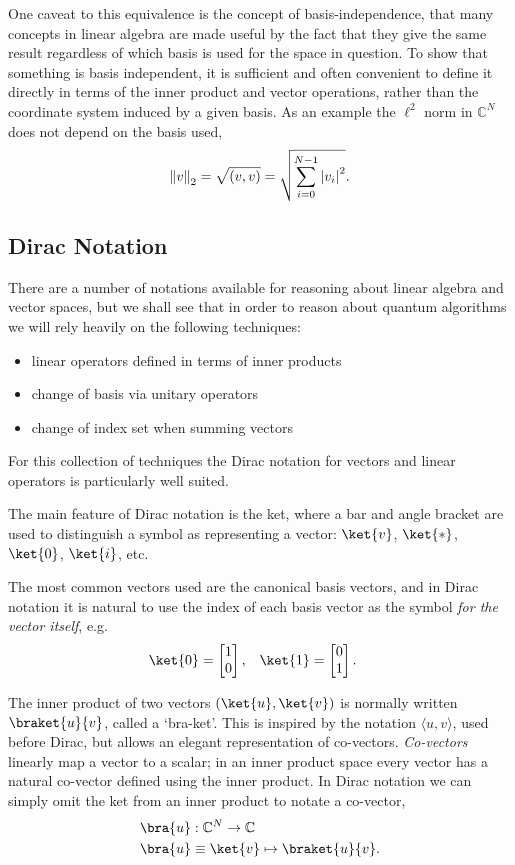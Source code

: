 One caveat to this equivalence is the concept of basis-independence, that many concepts in linear algebra are made useful by the fact that they give the same result regardless of which basis is used for the space in question. To show that something is basis independent, it is sufficient and often convenient to define it directly in terms of the inner product and vector operations, rather than the coordinate system induced by a given basis. As an example the $\ell^2$ norm in $\mathbb{C}^N$ does not depend on the basis used,
\[\left\Vert v \right\Vert_2 = \sqrt{(v, v)} = \sqrt{\sum_{i=0}^{N-1}\left| v_i \right|^2}.\]

\subsection{Dirac Notation}\label{dirac}
There are a number of notations available for reasoning about linear algebra and vector spaces, but we shall see that in order to reason about quantum algorithms we will rely heavily on the following techniques:
\begin{itemize}
	\item linear operators defined in terms of inner products
	\item change of basis via unitary operators
	\item change of index set when summing vectors
\end{itemize}
For this collection of techniques the Dirac notation for vectors and linear operators is particularly well suited.

The main feature of Dirac notation is the ket, where a bar and angle bracket are used to distinguish a symbol as representing a vector: $\ket{v}$, $\ket{*}$, $\ket{0}$, $\ket{i}$, etc.

The most common vectors used are the canonical basis vectors, and in Dirac notation it is natural to use the index of each basis vector as the symbol \textit{for the vector itself}, e.g.
\begin{align*}
	\ket{0} = \left[\begin{matrix}
		1\\
		0
	\end{matrix}\right],
	&&&
	\ket{1} = \left[\begin{matrix}
		0\\
		1
	\end{matrix}\right].
\end{align*}

The inner product of two vectors $(\ket{u}, \ket{v})$ is normally written $\braket{u}{v}$, called a `bra-ket'. This is inspired by the notation $\langle u, v\rangle$, used before Dirac, but allows an elegant representation of co-vectors. \emph{Co-vectors} linearly map a vector to a scalar; in an inner product space every vector has a natural co-vector defined using the inner product. In Dirac notation we can simply omit the ket from an inner product to notate a co-vector,
\begin{align*}
	\bra{u} &: \mathbb{C}^N \to \mathbb{C}
	\\\bra{u} &\equiv \ket{v} \mapsto \braket{u}{v}.
\end{align*}

